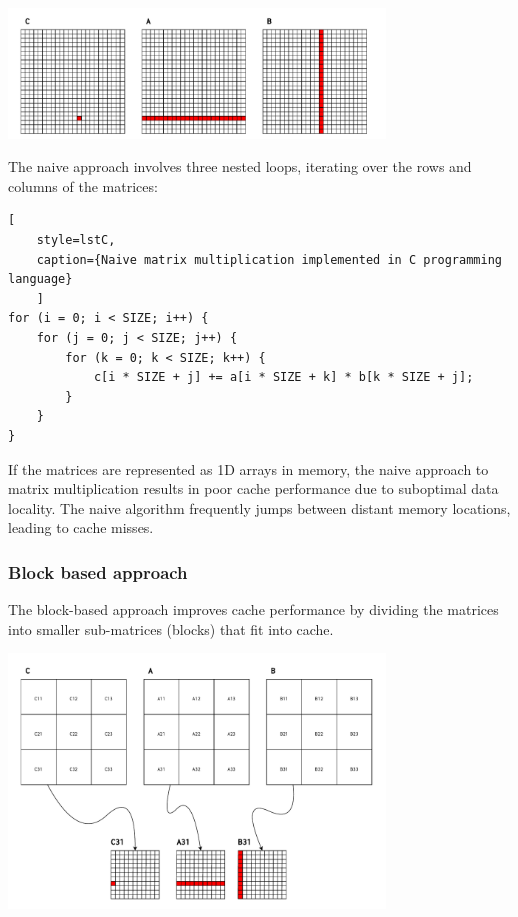 \begin{center}
	\centering
	\includegraphics[width=0.75\textwidth]{figures/05-analysis/mm_naive.pdf}
	\label{fig:mm_naive}
\end{center}

The naive approach involves three nested loops, iterating over the rows and columns of the matrices:

\begin{center}
\centering
\begin{minipage}{\linewidth}
\begin{lstlisting}[
	style=lstC,
    caption={Naive matrix multiplication implemented in C programming language}
    ]
for (i = 0; i < SIZE; i++) {
	for (j = 0; j < SIZE; j++) {
		for (k = 0; k < SIZE; k++) {
			c[i * SIZE + j] += a[i * SIZE + k] * b[k * SIZE + j];
		}
	}
}
\end{lstlisting}
\end{minipage}
\end{center}

\noindent If the matrices are represented as 1D arrays in memory, the naive approach to matrix multiplication results in poor cache performance due to suboptimal data locality.
The naive algorithm frequently jumps between distant memory locations, leading to cache misses.

\subsubsection*{Block based approach} \label{sec:mmblock}
The block-based approach improves cache performance by dividing the matrices into smaller sub-matrices (blocks) that fit into cache.

\begin{center}
	\centering
	\includegraphics[width=0.75\textwidth]{figures/05-analysis/mm_block.pdf}
	\label{fig:mm_block}
\end{center}

